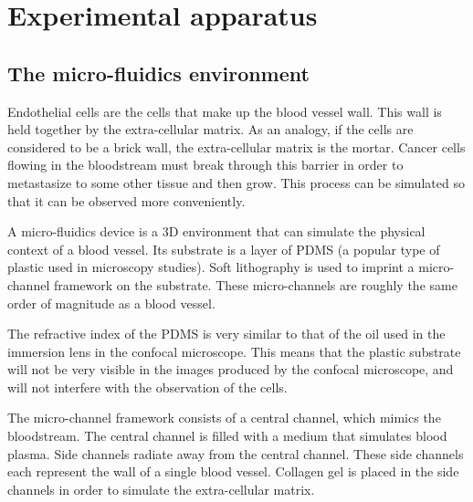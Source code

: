 
\chapter{Experimental apparatus}

\ifpdf
    \graphicspath{{Chapter4/Figs/Raster/}{Chapter4/Figs/PDF/}{Chapter4/Figs/}}
\else
    \graphicspath{{Chapter4/Figs/Vector/}{Chapter4/Figs/}}
\fi

\section{The micro-fluidics environment}

Endothelial cells are the cells that make up the blood vessel wall. This wall is held together by the extra-cellular matrix. As an analogy, if the cells are considered to be a brick wall, the extra-cellular matrix is the mortar. Cancer cells flowing in the bloodstream must break through this barrier in order to metastasize to some other tissue and then grow.  This process can be simulated so that it can be observed more conveniently.~\cite{fidler}

A micro-fluidics device is a 3D environment that can simulate the physical context of a blood vessel. Its substrate is a layer of PDMS (a popular type of plastic used in microscopy studies). Soft lithography is used to imprint a micro-channel framework on the substrate. These micro-channels are roughly the same order of magnitude as a blood vessel.

The refractive index of the PDMS is very similar to that of the oil used in the immersion lens in the confocal microscope. This means that the plastic substrate will not be very visible in the images produced by the confocal microscope, and will not interfere with the observation of the cells.

The micro-channel framework consists of a central channel, which mimics the bloodstream. The central channel is filled with a medium that simulates blood plasma. Side channels radiate away from the central channel. These side channels each represent the wall of a single blood vessel. Collagen gel is placed in the side channels in order to simulate the extra-cellular matrix.


